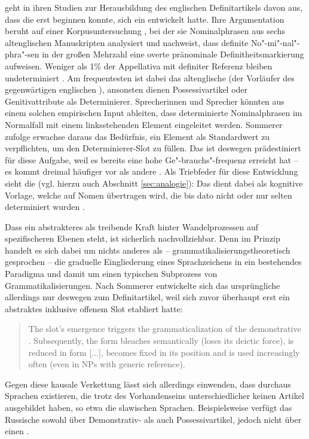 \textcite{Sommerer2012,Sommerer2015} geht in ihren Studien zur Herausbildung des englischen Definitartikels davon aus, dass die  erst beginnen konnte,  sich ein  entwickelt hatte. Ihre Argumentation beruht auf einer  Korpusuntersuchung  \parencite[vgl.][197--198]{Sommerer2012}, bei der sie Nominalphrasen aus sechs altenglischen Manuskripten analysiert und nachweist, dass definite No"-mi"-nal"-phra"-sen in der großen Mehrzahl eine overte pränominale Definitheitsmarkierung  aufweisen. Weniger als 1\% der Appellativa   mit definiter Referenz bleiben undeterminiert \parencite[122]{Sommerer2015}. Am frequentesten ist dabei das altenglische   (der Vorläufer des gegenwärtigen englischen ), ansonsten dienen Possessivartikel  oder Genitivattribute  als Determinierer. Sprecherinnen und Sprecher könnten aus einem solchen empirischen Input ableiten, dass determinierte Nominalphrasen  im Normalfall mit einem linksstehenden Element eingeleitet werden. Sommerer zufolge erwachse daraus das Bedürfnis, ein Element als Standardwert zu verpflichten, um den Determinierer-Slot zu füllen. Das   ist deswegen prädestiniert für diese Aufgabe, weil es bereits eine hohe Ge"-brauchs"-frequenz erreicht hat -- es kommt dreimal häufiger vor als andere  \parencite[125]{Sommerer2015}. Als Triebfeder für diese Entwicklung sieht \citeauthor{Sommerer2015} die  (vgl. hierzu auch Abschnitt \ref{sec:analogie}): Das  dient dabei als kognitive Vorlage, welche auf Nomen übertragen wird, die bis dato nicht oder nur selten determiniert wurden \parencite[125]{Sommerer2015}. 

Dass ein abstrakteres  als treibende Kraft hinter Wandelprozessen auf spezifischeren Ebenen steht, ist sicherlich nachvollziehbar. 
Denn im Prinzip handelt es sich dabei um nichts anderes als -- grammatikalisierungstheoretisch gesprochen -- die graduelle Eingliederung eines Sprachzeichens in ein bestehendes Paradigma und damit um einen typischen Subprozess von Grammatikalisierungen. Nach Sommerer entwickelte sich das ursprüngliche  allerdings nur deswegen zum Definitartikel, weil sich zuvor überhaupt erst ein abstraktes  inklusive offenem Slot etabliert hatte: \blockcquote[205]{Sommerer2012}{The slot’s emergence triggers the grammaticalization of the demonstrative . Subsequently, the form bleaches semantically (loses its deictic force), is reduced in form [...], becomes fixed in its position and is used increasingly often (even
in NPs with generic reference).} Gegen diese kausale Verkettung lässt sich allerdings einwenden, dass durchaus Sprachen existieren, die trotz des Vorhandenseins unterschiedlicher  keinen Artikel ausgebildet haben, so etwa die slawischen Sprachen. Beispielsweise verfügt das Russische sowohl über Demonstrativ-  als auch Possessivartikel,  jedoch nicht über einen . 
 
